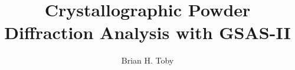\newif\ifKindle
\Kindlefalse   %
\newif\ifCover
\Coverfalse   %

\usepackage{xurl}
\usepackage{hyperref}
\ifKindle
    \usepackage{wrapfig}
    \hypersetup{draft=true}
\else
\fi

\ifCover
    \usepackage{pdfpages} %
    \usepackage{wrapfig}
\fi

\newcommand{\bookname}{Crystallographic Powder Diffraction Analysis with GSAS-II}
\title{\bookname}
\newcommand{\booksubtitle}{An Introduction to Rietveld Analysis}

\newcommand{\booklicense}{Creative Commons Attribution-NonCommercial-ShareAlike 4.0 International (CC BY-NC-SA 4.0, \url{https://creativecommons.org/licenses/by-nc-sa/4.0/deed.en})}
\author{Brian H. Toby}
\newcommand{\authorsubtitle}{Advanced Photon Source\\
Argonne National Laboratory}
\newcommand{\bookedition}{Edition 0.9.3 -- Preview version}

